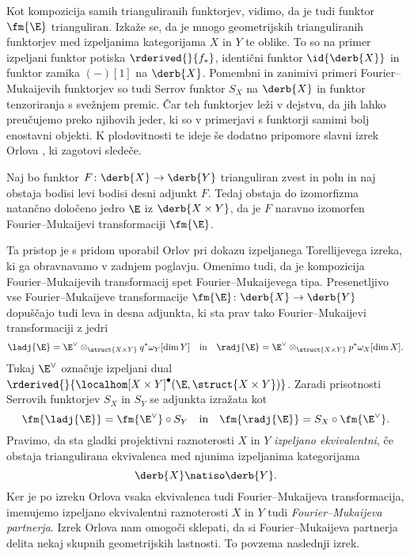 Kot kompozicija samih trianguliranih funktorjev, vidimo, da je tudi funktor $\fm{\E}$ trianguliran. Izkaže se, da je mnogo geometrijskih trianguliranih funktorjev med izpeljanima kategorijama $X$ in $Y$ te oblike. To so na primer izpeljani funktor potiska $\rderived{}{f_*}$, identični funktor $\id{\derb{X}}$ in funktor zamika $(-)[1]$ na $\derb{X}$. Pomembni in zanimivi primeri Fourier--Mukaijevih funktorjev so tudi Serrov funktor $S_X$ na $\derb{X}$ in funktor tenzoriranja s svežnjem premic. Čar teh funktorjev leži v dejstvu, da jih lahko preučujemo preko njihovih jeder, ki so v primerjavi s funktorji samimi bolj enostavni objekti. K plodovitnosti te ideje še dodatno pripomore slavni izrek Orlova \cite{Orlov2003}, ki zagotovi sledeče.

\begin{izrek}
    Naj bo funktor $F \colon \derb{X} \to \derb{Y}$ trianguliran zvest in poln in naj obstaja bodisi levi bodisi desni adjunkt $F$. Tedaj obstaja do izomorfizma natančno določeno jedro $\E$ iz $\derb{X \times Y}$, da je $F$ naravno izomorfen Fourier--Mukaijevi transformaciji $\fm{\E}$.
\end{izrek}
Ta pristop je s pridom uporabil Orlov \cite{Orlov2003} pri dokazu izpeljanega Torellijevega izreka, ki ga obravnavamo v zadnjem poglavju. Omenimo tudi, da je kompozicija Fourier--Mukaijevih transformacij spet Fourier--Mukai\-je\-vega tipa. Presenetljivo vse Fourier--Mu\-kai\-jeve transformacije $\fm{\E} \colon \derb{X} \to \derb{Y}$ dopuščajo tudi leva in desna adjunkta, ki sta prav tako Fourier--Mukaijevi transformaciji z jedri 
\[
    \ladj{\E} = \E^\vee \otimes_{\struct{X \times Y}} q^*\omega_Y[\dim Y] \quad \text{in} \quad 
    \radj{\E} = \E^\vee \otimes_{\struct{X \times Y}} p^*\omega_X[\dim X].
\]
Tukaj $\E^\vee$ označuje izpeljani dual $\rderived{}{\localhom[X \times Y]^\bullet(\E, \struct{X\times Y})}$. Zaradi prisotnosti Serrovih funktorjev $S_X$ in $S_Y$ se adjunkta izražata kot
\begin{equation*}
    \fm{\ladj{\E}} = \fm{\E^\vee} \circ S_Y \quad \text{in} \quad 
    \fm{\radj{\E}} = S_X \circ \fm{\E^\vee}.
\end{equation*}
Pravimo, da sta gladki projektivni raznoterosti $X$ in $Y$ \emph{izpeljano ekvivalentni}, če obstaja triangulirana ekvivalenca med njunima izpeljanima kategorijama
\[
    \derb{X} \natiso \derb{Y}.
\]
Ker je po izreku Orlova vsaka ekvivalenca tudi Fourier--Mukaijeva transformacija, imenujemo izpeljano ekvivalentni raznoterosti $X$ in $Y$ tudi \emph{Fourier--Mukaijeva partnerja}. Izrek Orlova nam omogoči sklepati, da si Fourier--Mukaijeva partnerja delita nekaj skupnih geometrijskih lastnosti. To povzema naslednji izrek.

